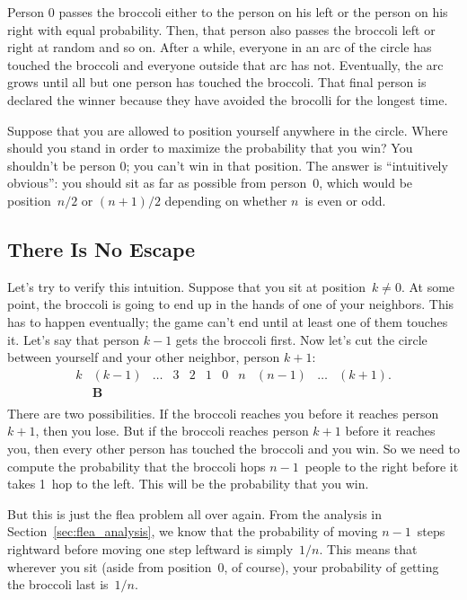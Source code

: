 Person 0 passes the broccoli either to the person on his left or the
person on his right with equal probability.  Then, that person also
passes the broccoli left or right at random and so on.  After a while,
everyone in an arc of the circle has touched the broccoli and everyone
outside that arc has not.  Eventually, the arc grows until all but one
person has touched the broccoli.  That final person is declared the
winner because they have avoided the brocolli for the longest time.

Suppose that you are allowed to position yourself anywhere in the
circle.  Where should you stand in order to maximize the probability
that you win?  You shouldn't be person 0; you can't win in that
position.  The answer is ``intuitively obvious'': you should sit as
far as possible from person~0, which would be position~$n / 2$ or $(n
+ 1)/2$ depending on whether $n$~is even or odd.

\subsection{There Is No Escape}

Let's try to verify this intuition.  Suppose that you sit at
position~$k \neq 0$.  At some point, the broccoli is going to end up
in the hands of one of your neighbors.  This has to happen eventually;
the game can't end until at least one of them touches it.  Let's say
that person $k - 1$ gets the broccoli first.  Now let's cut the circle
between yourself and your other neighbor, person $k+1$:
%
\[
\begin{array}{cccccccccccccc}
k & (k-1) & \ldots & 3 & 2 & 1 & 0 & n & (n-1) & \ldots & (k+1). \\
  & \mathbf{B} \\
\end{array}
\]
%
There are two possibilities.  If the broccoli reaches you before it
reaches person $k+1$, then you lose.  But if the broccoli reaches
person $k+1$ before it reaches you, then every other person has
touched the broccoli and you win.  So we need to compute the
probability that the broccoli hops $n - 1$~people to the right before
it takes 1~hop to the left.  This will be the probability that you
win.

But this is just the flea problem all over again.  From the analysis in
Section~\ref{sec:flea_analysis}, we know that the probability of moving
$n - 1$~steps rightward before moving one step leftward is
simply~$1/n$.  This means that wherever you sit (aside from
position~0, of course), your probability of getting the broccoli last
is~$1/n$.

